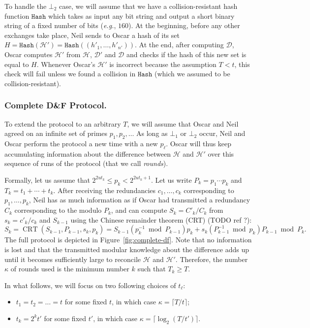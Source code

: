 \documentclass[11pt]{llncs}
\newcommand{\Set}{\mathcal{H}}
\newcommand{\SetD}{\mathcal{D}}
\newcommand{\df}{D\&F\xspace}
\newcommand{\eg}{\textit{e.g.}\xspace}
\newcommand{\Hash}{\ensuremath{\mathtt{Hash}}}
\DeclareMathOperator{\CRT}{CRT}
\begin{document}
To handle the $\bot_2$ case, we will assume that we have a collision-resistant hash function $\Hash$ which takes as input any bit string and output a short binary string of a fixed number of bits (\eg, $160$).
At the beginning, before any other exchanges take place, Neil sends to Oscar a hash of its set $H = \Hash(\Set') = \Hash((h'_1,\dots,h'_{n'}))$. At the end, after computing $\SetD$, Oscar computes $\Set'$ from $\Set$, $\SetD'$ and $\SetD$ and checks if the hash of this new set is equal to $H$.
Whenever Oscar's $\Set'$ is incorrect because the assumption $T < t$, this check will fail unless we found a collision in $\Hash$ (which we assumed to be collision-resistant).

\subsubsection{Complete \df Protocol.}
\label{sec:complete-df}

To extend the protocol to an arbitrary $T$, we will assume that Oscar and Neil agreed on an infinite set of primes $p_1,p_2,\ldots$ As long as $\bot_1$ or $\bot_2$ occur, Neil and Oscar perform the protocol a new time with a new $p_\ell$. Oscar will thus keep accumulating information about the difference between $\Set$ and $\Set'$ over this sequence of runs of the protocol (that we call \emph{rounds}).

Formally, let us assume that $2^{2 u t_k} \le p_k < 2^{2 u t_k +1}$.
Let us write $P_k = p_1 \cdots p_k$ and $T_k = t_1 + \cdots + t_k$.
After receiving the redundancies $c_1,\dots,c_k$ corresponding to $p_1,\dots,p_k$, Neil has as much information as if Oscar had transmitted a redundancy $C_k$ corresponding to the modulo $P_k$, and can compute $S_k = C'_k / C_k$ from $s_k = c'_k/c_k$ and $S_{k-1}$ using the Chinese remainder theorem (CRT) (TODO ref ?): 
\[ S_k = \CRT(S_{k-1},P_{k-1},s_k,p_k) = S_{k-1} (p_k^{-1} \bmod P_{k-1}) p_k + s_k (P_{k-1}^{-1} \bmod p_k) P_{k-1} \bmod P_k. \]
The full protocol is depicted in Figure~\ref{fig:complete-df}.
Note that no information is lost and that the transmitted modular knowledge about the difference adds up until it becomes sufficiently large to reconcile $\Set$ and $\Set'$.
Therefore, the number $\kappa$ of rounds used is the minimum number $k$ such that $T_k \ge T$.

In what follows, we will focus on two following choices of $t_\ell$:
\begin{itemize}
\item $t_1 = t_2 = \dots = t$ for some fixed $t$, in which case $\kappa = \lceil T/t \rceil$;
\item $t_k = 2^k t'$ for some fixed $t'$, in which case $\kappa = \lceil \log_2(T / t') \rceil$.
\end{itemize}
\end{document}
